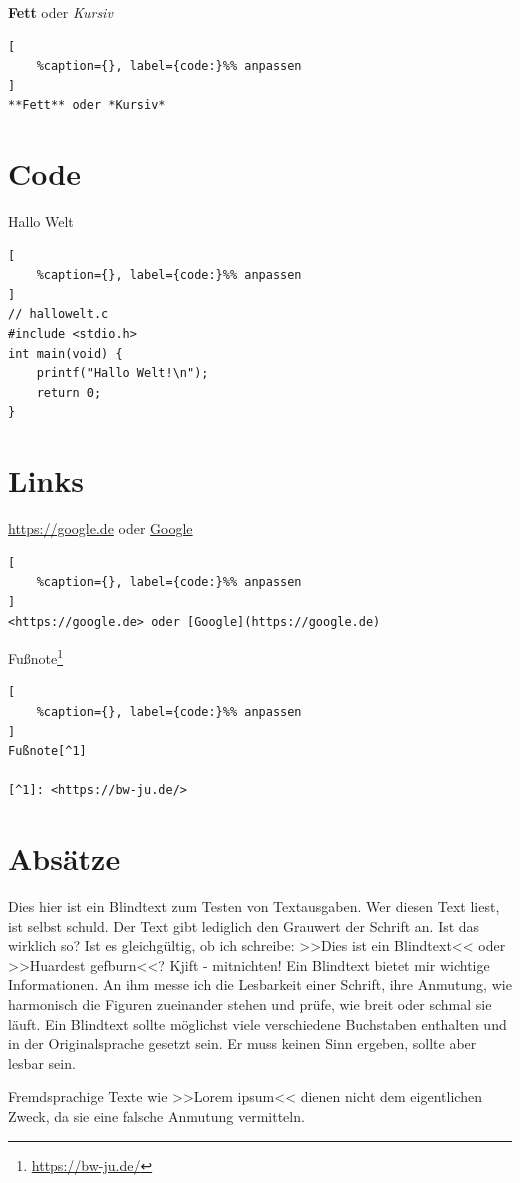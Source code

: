 \textbf{Fett} oder \emph{Kursiv}

\lstset{language=Bash}%
\begin{lstlisting}[
	%caption={}, label={code:}%% anpassen
]
**Fett** oder *Kursiv*
\end{lstlisting}

\section{Code}\label{code}

Hallo Welt %

\lstset{language=Bash}%
\begin{lstlisting}[
	%caption={}, label={code:}%% anpassen
]
// hallowelt.c
#include <stdio.h>
int main(void) {
    printf("Hallo Welt!\n");
    return 0;
}
\end{lstlisting}

\section{Links}\label{links}

\url{https://google.de} oder \href{https://google.de}{Google}

\lstset{language=Bash}%
\begin{lstlisting}[
	%caption={}, label={code:}%% anpassen
]
<https://google.de> oder [Google](https://google.de)
\end{lstlisting}

Fußnote\footnote{\url{https://bw-ju.de/}}

\lstset{language=Bash}%
\begin{lstlisting}[
	%caption={}, label={code:}%% anpassen
]
Fußnote[^1]       

[^1]: <https://bw-ju.de/>
\end{lstlisting}

\section{Absätze}\label{absaetze}

Dies hier ist ein Blindtext zum Testen von Textausgaben. Wer diesen Text
liest, ist selbst schuld. Der Text gibt lediglich den Grauwert der
Schrift an. Ist das wirklich so? Ist es gleichgültig, ob ich schreibe:
>>Dies ist ein Blindtext<< oder >>Huardest gefburn<<? Kjift -
mitnichten! Ein Blindtext bietet mir wichtige Informationen. An ihm
messe ich die Lesbarkeit einer Schrift, ihre Anmutung, wie harmonisch
die Figuren zueinander stehen und prüfe, wie breit oder schmal sie
läuft. Ein Blindtext sollte möglichst viele verschiedene Buchstaben
enthalten und in der Originalsprache gesetzt sein. Er muss keinen Sinn
ergeben, sollte aber lesbar sein.

Fremdsprachige Texte wie >>Lorem ipsum<< dienen nicht dem eigentlichen
Zweck, da sie eine falsche Anmutung vermitteln.

